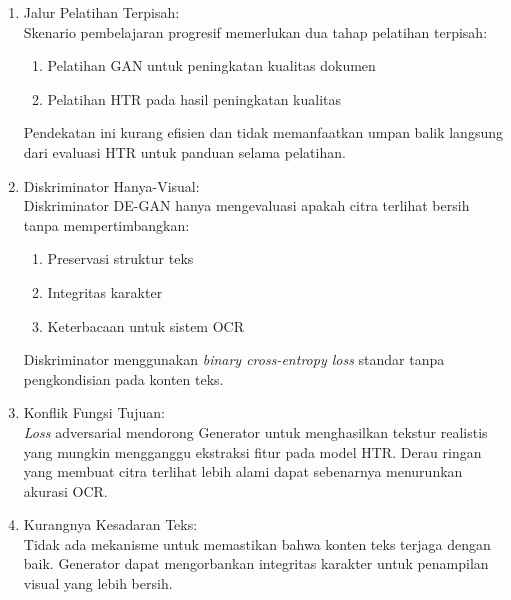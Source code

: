 \documentclass[12pt,a4paper]{article}
\begin{document}
\begin{enumerate}[leftmargin=*, labelindent=0pt, itemsep=1ex, topsep=0pt]
\begin{enumerate}[leftmargin=1.5em, labelsep=0.5em, itemindent=0pt, label=\alph*., topsep=0pt, parsep=0pt, itemsep=0pt]
      \item Jalur Pelatihan Terpisah: \mbox{}\\[0.1em]
            Skenario pembelajaran progresif memerlukan dua tahap pelatihan terpisah:
            \begin{enumerate}[leftmargin=1.5em, labelsep=0.5em, itemindent=0pt, label=\alph*., topsep=0pt, parsep=0pt, itemsep=0pt]
                  \item Pelatihan GAN untuk peningkatan kualitas dokumen
                  \item Pelatihan HTR pada hasil peningkatan kualitas
            \end{enumerate}
            Pendekatan ini kurang efisien dan tidak memanfaatkan umpan balik langsung dari evaluasi HTR untuk panduan selama pelatihan.

      \item Diskriminator Hanya-Visual: \mbox{}\\[0.1em]
            Diskriminator DE-GAN hanya mengevaluasi apakah citra terlihat bersih tanpa mempertimbangkan:

            \begin{enumerate}[leftmargin=1.5em, labelsep=0.5em, itemindent=0pt, label=\alph*., topsep=0pt, parsep=0pt, itemsep=0pt]
                  \item Preservasi struktur teks
                  \item Integritas karakter
                  \item Keterbacaan untuk sistem OCR
            \end{enumerate}
            Diskriminator menggunakan \textit{binary cross-entropy loss} standar tanpa pengkondisian pada konten teks.

      \item Konflik Fungsi Tujuan: \mbox{}\\[0.1em]
            \textit{Loss} adversarial mendorong Generator untuk menghasilkan tekstur realistis yang mungkin mengganggu ekstraksi fitur pada model HTR. Derau ringan yang membuat citra terlihat lebih alami dapat sebenarnya menurunkan akurasi OCR.

      \item Kurangnya Kesadaran Teks: \mbox{}\\[0.1em]
            Tidak ada mekanisme untuk memastikan bahwa konten teks terjaga dengan baik. Generator dapat mengorbankan integritas karakter untuk penampilan visual yang lebih bersih.
\end{enumerate}


\end{enumerate}
\end{document}

